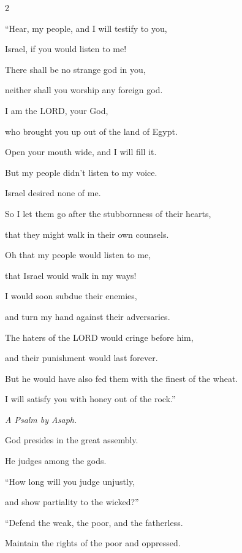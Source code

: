 \begin{multicols}{2}
	\vspace{\baselineskip}
	
	
	
	\myverse{}“Hear, my people, and I will testify to you,
	
	Israel, if you would listen to me!
	
	
	\myverse{}There shall be no strange god in you,
	
	neither shall you worship any foreign god.
	
	
	\myverse{}I am the LORD, your God,
	
	who brought you up out of the land of Egypt.
	
	Open your mouth wide, and I will fill it.
	
	
	\myverse{}But my people didn’t listen to my voice.
	
	Israel desired none of me.
	
	
	\myverse{}So I let them go after the stubbornness of their hearts,
	
	that they might walk in their own counsels.
	
	
	\myverse{}Oh that my people would listen to me,
	
	that Israel would walk in my ways!
	
	
	\myverse{}I would soon subdue their enemies,
	
	and turn my hand against their adversaries.
	
	
	\myverse{}The haters of the LORD would cringe before him,
	
	and their punishment would last forever.
	
	
	\myverse{}But he would have also fed them with the finest of the wheat.
	
	I will satisfy you with honey out of the rock.”
	
	
	\mychapter{}\textit{A Psalm by Asaph.}
	
\quad	\myverse*{}God presides in the great assembly.
	
	He judges among the gods.
	
	
	\myverse{}“How long will you judge unjustly,
	
	and show partiality to the wicked?”
	
	\vspace{\baselineskip}
	
	
	
	\myverse{}“Defend the weak, the poor, and the fatherless.
	
	Maintain the rights of the poor and oppressed.
	

\end{multicols}

